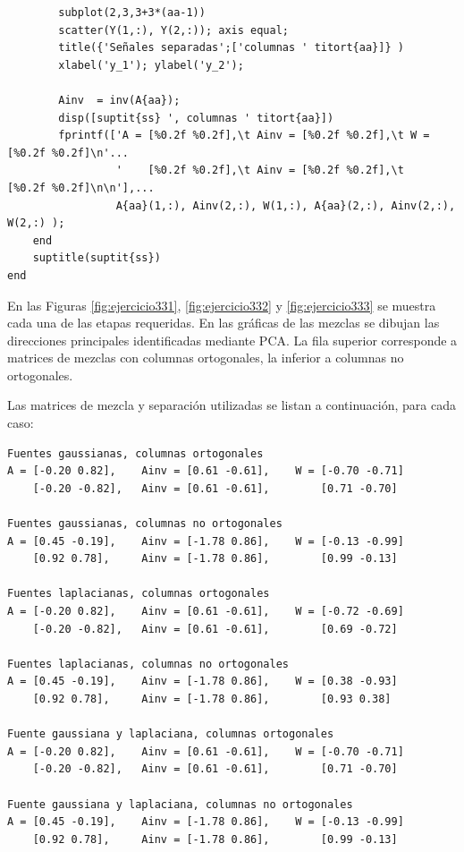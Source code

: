 \documentclass[11pt,a4paper,final]{article}
\begin{document}
\begin{verbatim}
        subplot(2,3,3+3*(aa-1))
        scatter(Y(1,:), Y(2,:)); axis equal;
        title({'Señales separadas';['columnas ' titort{aa}]} )
        xlabel('y_1'); ylabel('y_2');

        Ainv  = inv(A{aa});
        disp([suptit{ss} ', columnas ' titort{aa}])
        fprintf(['A = [%0.2f %0.2f],\t Ainv = [%0.2f %0.2f],\t W = [%0.2f %0.2f]\n'...
                 '    [%0.2f %0.2f],\t Ainv = [%0.2f %0.2f],\t     [%0.2f %0.2f]\n\n'],...
                 A{aa}(1,:), Ainv(2,:), W(1,:), A{aa}(2,:), Ainv(2,:), W(2,:) );
    end
    suptitle(suptit{ss})
end
\end{verbatim}


En las Figuras \ref{fig:ejercicio331}, \ref{fig:ejercicio332} y \ref{fig:ejercicio333} se muestra cada una de las etapas requeridas. En las gráficas de las mezclas se dibujan las direcciones principales identificadas mediante PCA. La fila superior corresponde a matrices de mezclas con columnas ortogonales, la inferior a columnas no ortogonales.

Las matrices de mezcla y separación utilizadas se listan a continuación, para cada caso:
\begin{verbatim}Fuentes gaussianas, columnas ortogonales
A = [-0.20 0.82],	 Ainv = [0.61 -0.61],	 W = [-0.70 -0.71]
    [-0.20 -0.82],	 Ainv = [0.61 -0.61],	     [0.71 -0.70]

Fuentes gaussianas, columnas no ortogonales
A = [0.45 -0.19],	 Ainv = [-1.78 0.86],	 W = [-0.13 -0.99]
    [0.92 0.78],	 Ainv = [-1.78 0.86],	     [0.99 -0.13]

Fuentes laplacianas, columnas ortogonales
A = [-0.20 0.82],	 Ainv = [0.61 -0.61],	 W = [-0.72 -0.69]
    [-0.20 -0.82],	 Ainv = [0.61 -0.61],	     [0.69 -0.72]

Fuentes laplacianas, columnas no ortogonales
A = [0.45 -0.19],	 Ainv = [-1.78 0.86],	 W = [0.38 -0.93]
    [0.92 0.78],	 Ainv = [-1.78 0.86],	     [0.93 0.38]

Fuente gaussiana y laplaciana, columnas ortogonales
A = [-0.20 0.82],	 Ainv = [0.61 -0.61],	 W = [-0.70 -0.71]
    [-0.20 -0.82],	 Ainv = [0.61 -0.61],	     [0.71 -0.70]

Fuente gaussiana y laplaciana, columnas no ortogonales
A = [0.45 -0.19],	 Ainv = [-1.78 0.86],	 W = [-0.13 -0.99]
    [0.92 0.78],	 Ainv = [-1.78 0.86],	     [0.99 -0.13]
\end{verbatim}
\end{document}
